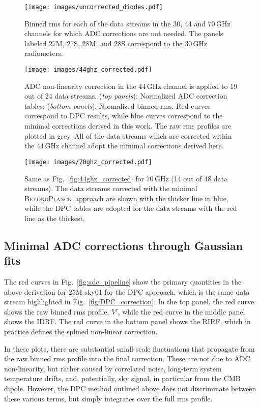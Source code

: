 \documentclass[twocolumn]{aa}
\newcommand{\BP}{\textsc{BeyondPlanck}}
\begin{document}
\begin{figure}[t!]
\texttt{[image: images/uncorrected\_diodes.pdf]}
\caption{Binned rms for each of the data streams in the 30, 44 and 70\,GHz channels for which ADC corrections are not needed. The panels labeled 27M, 27S, 28M, and 28S correspond to the 30\,GHz radiometers.}
\label{fig:uncorrected}
\end{figure}

\begin{figure*}[p]
\texttt{[image: images/44ghz\_corrected.pdf]}
\caption{ADC non-linearity correction in the 44\,GHz channel is applied to 19 out of 24 data streams. (\emph{top panels}): Normalized ADC correction tables; (\emph{bottom panels}): Normalized binned rms. Red curves correspond to DPC results, while blue curves correspond to the minimal corrections derived in this work. The raw rms profiles are plotted in grey. All of the data streams which are corrected within the 44\,GHz channel adopt the minimal corrections derived here.}\label{fig:44ghz_corrected}
\vspace*{6mm}

\texttt{[image: images/70ghz\_corrected.pdf]}
\caption{Same as Fig.~\ref{fig:44ghz_corrected} for 70\,GHz (14 out of 48 data streams). The data streams corrected with the minimal \BP\ approach are shown with the thicker line in blue, while the DPC tables are adopted for the data streams with the red line as the thickest.}\label{fig:70ghz_corrected}
\end{figure*}

\subsection{Minimal ADC corrections through Gaussian fits}
\label{sub:implementation}

The red curves in Fig.~\ref{fig:adc_pipeline} show the primary quantities in the above derivation for 25M-sky01 for the DPC approach, which is the same data stream highlighted in Fig.~\ref{fig:DPC_correction}. In the top panel, the red curve shows the raw binned rms profile, $V'$, while the red curve in the middle panel shows the IDRF. The red curve in the bottom panel shows the RIRF, which in practice defines the splined non-linear correction.

In these plots, there are substantial small-scale fluctuations that propagate from the raw binned rms profile into the final correction. These are not due to ADC non-linearity, but rather caused by correlated noise, long-term system temperature drifts, and, potentially, sky signal, in particular from the CMB dipole. However, the DPC method outlined above does not discriminate between these various terms, but simply integrates over the full rms profile.
\end{document}
